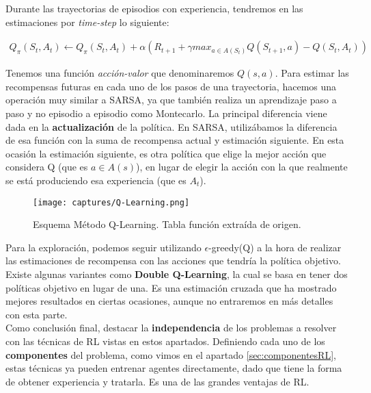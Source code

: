 \documentclass[11pt,fleqn]{book} %
\begin{document}
Durante las trayectorias de episodios con experiencia, tendremos en las estimaciones por \textit{time-step} lo siguiente:

\begin{align*}
Q_\pi(S_t,A_t) \leftarrow Q_\pi(S_t,A_t)+\alpha\left(R_{t+1}+\gamma max_{a\in A(S_t)}Q(S_{t+1},a) - Q(S_t,A_t)\right)
\end{align*}

Tenemos una función \textit{acción-valor} que denominaremos $Q(s,a)$. Para estimar las recompensas futuras en cada uno de los pasos de una trayectoria, hacemos una operación muy similar a SARSA, ya que también realiza un aprendizaje paso a paso y no episodio a episodio como Montecarlo. La principal diferencia viene dada en la \textbf{actualización} de la política. En SARSA, utilizábamos la diferencia de esa función con la suma de recompensa actual y estimación siguiente. En esta ocasión la estimación siguiente, es otra política que elige la mejor acción que considera Q (que es $a \in A(s)$), en lugar de elegir la acción con la que realmente se está produciendo esa experiencia (que es $A_t$).\\

\begin{figure}[H]
	\centering\texttt{[image: captures/Q-Learning.png]}
	\caption{Esquema Método Q-Learning. Tabla función extraída de origen. \cite{article:RLromero}}
	\label{fig:qlearning} %
\end{figure}

Para la exploración, podemos seguir utilizando $\epsilon$-greedy(Q) a la hora de realizar las estimaciones de recompensa con las acciones que tendría la política objetivo. \\

Existe algunas variantes como \textbf{Double Q-Learning}, la cual se basa en tener dos políticas objetivo en lugar de una. Es una estimación cruzada que ha mostrado mejores resultados en ciertas ocasiones, aunque no entraremos en más detalles con esta parte. \\

Como conclusión final, destacar la \textbf{independencia} de los problemas a resolver con las técnicas de RL vistas en estos apartados. Definiendo cada uno de los \textbf{componentes} del problema, como vimos en el apartado \ref{sec:componentesRL}, estas técnicas ya pueden entrenar agentes directamente, dado que tiene la forma de obtener experiencia y tratarla. Es una de las grandes ventajas de RL.
\end{document}
